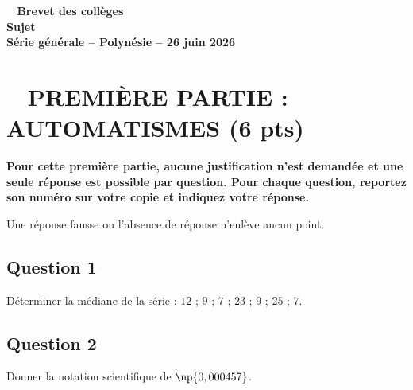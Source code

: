 \documentclass[12pt,a4paper,french]{article}
\begin{document}
	\pagestyle{fancy}

	\thispagestyle{empty}


	\begin{center}
		{\Large \textbf{\decofourleft~ Brevet des collèges ~\decofourright\\[10pt]Sujet\\[10pt]  Série générale -- Polynésie -- 26 juin 2026 }}
	\end{center}


\section*{\hfill~ PREMIÈRE PARTIE : AUTOMATISMES (6 pts)\hfill~}

\textbf{Pour cette première partie, aucune justification n'est demandée et une seule réponse est possible par question. Pour chaque question, reportez son numéro sur votre copie et indiquez votre réponse.}

Une réponse fausse ou l'absence de réponse n'enlève aucun point.

\subsection*{Question 1}

Déterminer la médiane de la série : $12$ ; $9$ ; $7$ ; $23$ ; $9$ ; $25$ ; $7$.



\subsection*{Question 2}

\medskip

Donner la notation scientifique de $\np{0,000457}$.
\end{document}
